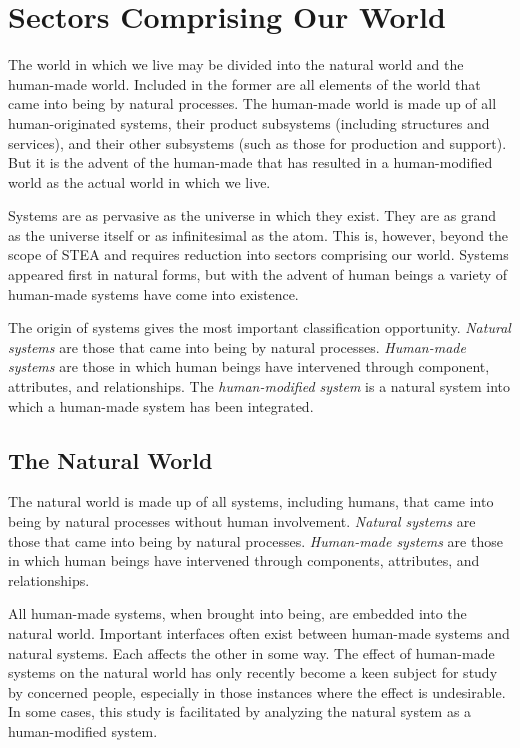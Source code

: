 \section{Sectors Comprising Our World}\label{sec:sectorsComprisingWorld}

The world in which we live may be divided into the natural world and the human-made world.  Included in the former are all elements of the world that came into being by natural processes. The human-made world is made up of all human-originated systems, their product subsystems (including structures and services), and their other subsystems (such as those for production and support).  But it is the advent of the human-made that has resulted in a human-modified world as the actual world in which we live.

Systems are as pervasive as the universe in which they exist.  They are as grand as the universe itself or as infinitesimal as the atom.  This is, however, beyond the scope of STEA and requires reduction into sectors comprising our world.  Systems appeared first in natural forms, but with the advent of human beings a variety of human-made systems have come into existence.

The origin of systems gives the most important classification opportunity.  \textit{Natural systems} are those that came into being by natural processes.  \textit{Human-made systems} are those in which human beings have intervened through component, attributes, and relationships.  The \textit{human-modified system} is a natural system into which a human-made system has been integrated.

\subsection{The Natural World}\label{sec:NaturalWorld}

The natural world is made up of all systems, including humans, that came into being by natural processes without human involvement. \textit{Natural systems} are those that came into being by natural processes. \textit{Human-made systems} are those in which human beings have intervened through components, attributes, and relationships. 

All human-made systems, when brought into being, are embedded into the natural world. Important interfaces often exist between human-made systems and natural systems. Each affects the other in some way. The effect of human-made systems on the natural world has only recently become a keen subject for study by concerned people, especially in those instances where the effect is undesirable. In some cases, this study is facilitated by analyzing the natural system as a human-modified system.

